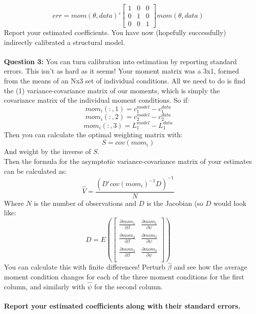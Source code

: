 \documentclass[11pt]{article}
\begin{document}
$$err=mom(\theta,data)'\left[\begin{array}{ccc}1 & 0 & 0 \\ 0 & 1 & 0 \\ 0 & 0 & 1\end{array}\right]mom(\theta,data)$$
Report your estimated coefficients.  You have now (hopefully successfully) indirectly calibrated a structural model. \\
\ \\
\textbf{Question 3:}  You can turn calibration into estimation by reporting standard errors. This isn't as hard as it seems! Your moment matrix was a 3x1, formed from the means of an Nx3 set of individual conditions. All we need to do is find the (1) variance-covariance matrix of our moments, which is simply the covariance matrix of the individual moment conditions.  So if:
$$mom_i(:,1) = c_1^{model}-c_1^{data}$$
$$mom_i(:,2) = c_2^{model}-c_2^{data}$$
$$mom_i(:,3) = L_1^{model}-L_1^{data}$$
Then you can calculate the optimal weighting matrix with:
$$S=cov(mom_i)$$
And weight by the inverse of $S$.  \\
Then the formula for the asymptotic variance-covariance matrix of your estimates can be calculated as:
$$\hat{V}=\frac{\left(D'cov(mom_i)^{-1}D\right)^{-1}}{N}$$
Where $N$ is the number of observations and $D$ is the Jacobian (so $D$ would look like:
$$D=E\left(\left[\begin{array}{ccc}\frac{\partial mom_1}{\partial \beta} & \frac{\partial mom_1}{\partial \psi} \\ \frac{\partial mom_2}{\partial \beta} & \frac{\partial mom_2}{\partial \psi} \\ \frac{\partial mom_3}{\partial \beta} & \frac{\partial mom_3}{\partial \psi} \\\end{array}\right]\right)$$
You can calculate this with finite differences!  Perturb $\hat{\beta}$ and see how the average moment condition changes for each of the three moment conditions for the first column, and similarly with $\hat{\psi}$ for the second column.
\ \\
\ \\
\textbf{Report your estimated coefficients along with their standard errors.}
 \\
\ \\
\end{document}
